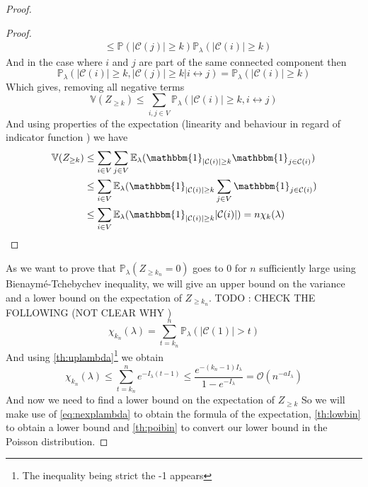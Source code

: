\begin{proof}
\begin{proof}
\begin{align}
			&\leq \mathbb{P}( |\mathcal{C}(j)| \geq k ) \mathbb{P}_{\lambda}(|\mathcal{C}(i)| \geq k) 
		\end{align}
		And in the case where $i$ and $j$ are part of the same connected component then
		\begin{equation}\label{posval}
			\mathbb{P}_{\lambda}(|\mathcal{C}(i)| \geq k, |\mathcal{C}(j)| \geq k | i \leftrightarrow j)
			=\mathbb{P}_{\lambda}(|\mathcal{C}(i)| \geq k)
		\end{equation}
		Which gives, removing all negative terms
		\begin{equation}
			\mathbb{V}(Z_{\geq k}) \leq \sum_{i,j \in V} \mathbb{P}_{\lambda}(|\mathcal{C}(i)|\geq k, i \leftrightarrow j)
		\end{equation}
		And using properties of the expectation (linearity and behaviour in regard of indicator function ) we have
		\begin{align}
			\mathbb{V}(Z_{\geq k}) &\leq \sum_{i \in V}\sum_{j \in V} \mathbb{E}_{\lambda} ( \mathbbm{1}_{|\mathcal{C}(i)|\geq k} \mathbbm{1}_{j \in \mathcal{C}(i)})\\
				&\leq \sum_{i \in V} \mathbb{E}_{\lambda} ( \mathbbm{1}_{|\mathcal{C}(i)|\geq k} \sum_{j\in V} \mathbbm{1}_{j \in \mathcal{C}(i)}) \\
				&\leq \sum_{i \in V} \mathbb{E}_{\lambda} ( \mathbbm{1}_{|\mathcal{C}(i)|\geq k}  |\mathcal{C}(i)|) = n\chi_k(\lambda) 
		\end{align}
	\end{proof}
	As we want to prove that $\mathbb{P}_{\lambda}(Z_{\geq k_n} = 0)$ goes to 0 for $n$ sufficiently large using Bienaymé-Tchebychev inequality, we will give an upper bound on the variance and a lower bound on the expectation of $Z_{\geq k_n}$.
	TODO : CHECK THE FOLLOWING (NOT CLEAR WHY )
	\begin{equation}
		\chi_{k_n}(\lambda) = \sum_{t=k_n}^{n} \mathbb{P}_{\lambda}(|\mathcal{C}(1)| > t) 
	\end{equation}
	And using \ref{th:uplambda}\footnote{The inequality being strict the -1 appears}  we obtain
	\begin{equation}
		\chi_{k_n}(\lambda) \leq \sum_{t=k_n}^{n} e^{-I_{\lambda}(t-1)} \leq \frac{e^{-(k_n -1)I_{\lambda}}}{1-e^{-I_{\lambda}}} = \mathcal{O}(n^{-a I_{\lambda}})
	\end{equation}
	And now we need to find a lower bound on the expectation of $Z_{\geq k}$ So we will make use of \ref{eq:nexplambda} to obtain the formula of the expectation, 
	\ref{th:lowbin} to obtain a lower bound and \ref{th:poibin} to convert our lower bound in the Poisson distribution.

\end{proof}
